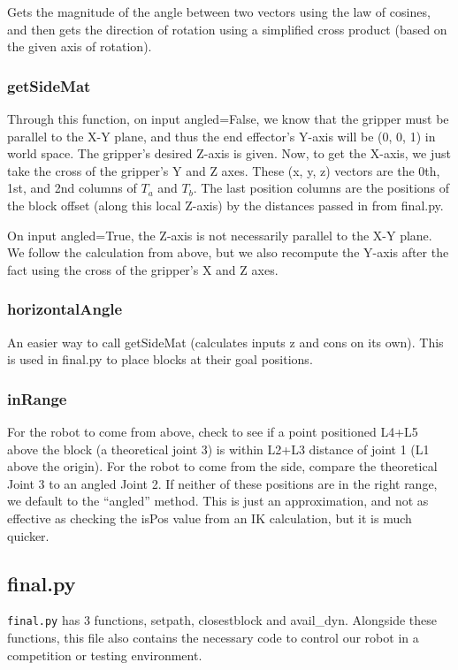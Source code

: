 \documentclass{article}
\begin{document}
    Gets the magnitude of the angle between two vectors using the law of cosines, and then gets the direction of rotation using a simplified cross product (based on the given axis of rotation).
    
    \subsubsection{getSideMat}
    
    Through this function, on input angled=False, we know that the gripper must be parallel to the X-Y plane, and thus the end effector’s Y-axis will be (0, 0, 1) in world space. The gripper’s desired Z-axis is given. Now, to get the X-axis, we just take the cross of the gripper’s Y and Z axes. These (x, y, z) vectors are the 0th, 1st, and 2nd columns of $T_a$ and $T_b$. The last position columns are the positions of the block offset (along this local Z-axis) by the distances passed in from final.py.
    
    On input angled=True, the Z-axis is not necessarily parallel to the X-Y plane. We follow the calculation from above, but we also recompute the Y-axis after the fact using the cross of the gripper’s X and Z axes.
    
    \subsubsection{horizontalAngle}
    
    An easier way to call getSideMat (calculates inputs z and cons on its own). This is used in final.py to place blocks at their goal positions.
    
    \subsubsection{inRange}
    For the robot to come from above, check to see if a point positioned  L4+L5 above the block (a theoretical joint 3) is within L2+L3 distance of joint 1 (L1 above the origin). For the robot to come from the side, compare the theoretical Joint 3 to an angled Joint 2. If neither of these positions are in the right range, we default to the “angled” method. This is just an approximation, and not as effective as checking the isPos value from an IK calculation, but it is much quicker.

\subsection{final.py}
    \verb|final.py| has 3 functions, setpath, closestblock and avail\_dyn.  Alongside these functions, this file also contains the necessary code to control our robot in a competition or testing environment.  
    
\end{document}
